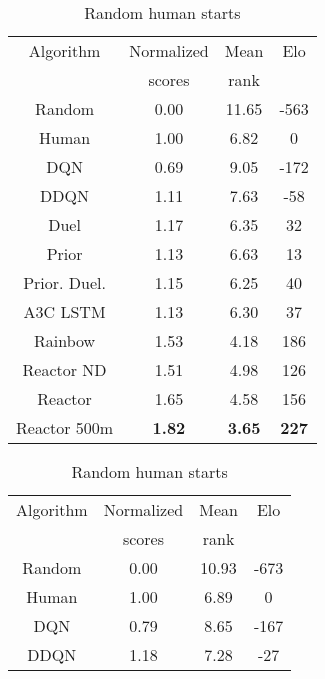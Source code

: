 \documentclass{article}
\begin{document}
\begin{table}[ht]
\centering
\hspace{-3cm}
\begin{minipage}{.55\textwidth}
\begin{center}
\begin{small}
\begin{sc}
\clearpage{}\begin{tabular}{| c | c | c | c |}
\hline
Algorithm & Normalized & Mean& Elo \\
 & scores & rank &\\
\hline
Random & 0.00 & 11.65 & -563\\
Human & 1.00 & 6.82 & 0\\
DQN & 0.69 & 9.05 & -172\\
DDQN & 1.11 & 7.63 & -58\\
Duel & 1.17 & 6.35 & 32\\
Prior & 1.13 & 6.63 & 13\\
Prior. Duel. & 1.15 & 6.25 & 40\\
A3C LSTM & 1.13 & 6.30 & 37\\
Rainbow & 1.53 & 4.18 & 186\\
Reactor ND  & 1.51 & 4.98 & 126\\
Reactor & 1.65 & 4.58 & 156\\
Reactor 500m & {\bf 1.82} & {\bf 3.65} & {\bf 227}\\
\hline
\end{tabular}
\clearpage{}\hfill
\end{sc}
\end{small}
\end{center}
\vspace{-0.2 in}
\caption{\small Random human starts}
\label{comparison-table1}
\end{minipage}
\begin{minipage}{.35\textwidth}
\begin{center}
\begin{small}
\begin{sc}
\hspace{2cm} \clearpage{}\begin{tabular}{| c | c | c | c |}
\hline
Algorithm & Normalized & Mean& Elo \\
 & scores & rank &\\
\hline
Random & 0.00 & 10.93 & -673\\
Human & 1.00 & 6.89 & 0\\
DQN & 0.79 & 8.65 & -167\\
DDQN & 1.18 & 7.28 & -27\\

\end{tabular}
\end{sc}
\end{small}
\end{center}
\end{minipage}
\end{table}
\end{document}
